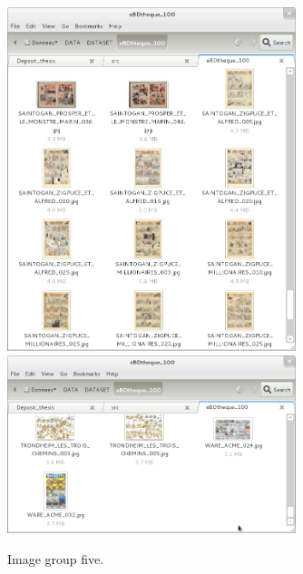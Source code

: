   \begin{figure}[h!]  %
    \centering
    
    \includegraphics[trim= 5px 10px 30px 152px, clip, width=0.75\textwidth]{thumb_09.png}
    \\
    \includegraphics[trim= 5px 10px 30px 152px, clip, width=0.75\textwidth]{thumb_10.png}
    \caption{Image group five.}
    \label{fig:app:9_10}
  \end{figure}


